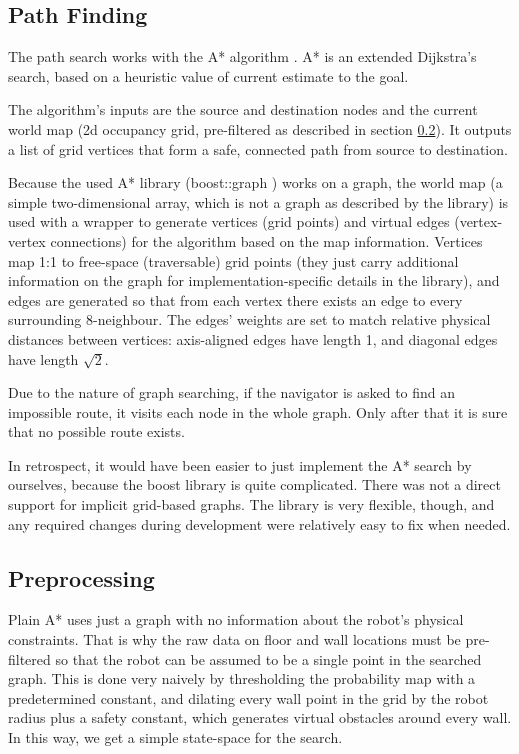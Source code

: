 \documentclass[a4paper,10pt]{article}
\begin{document}
\subsection{Path Finding}

The path search works with the A* algorithm \cite{hart1968formal}. A* is an extended Dijkstra’s search, based on a heuristic value of current estimate to the goal.

The algorithm's inputs are the source and destination nodes and the current world map (2d occupancy grid, pre-filtered as described in section \ref{navi_prepros}). It outputs a list of grid vertices that form a safe, connected path from source to destination.

Because the used A* library (boost::graph \cite{navi_boost})  works on a graph, the world map (a simple two-dimensional array, which is not a graph as described by the library) is used with a wrapper to generate vertices (grid points) and virtual edges (vertex-vertex connections) for the algorithm based on the map information. Vertices map 1:1 to free-space (traversable) grid points (they just carry additional information on the graph for implementation-specific details in the library), and edges are generated so that from each vertex there exists an edge to every surrounding 8-neighbour. The edges' weights are set to match relative physical distances between vertices: axis-aligned edges have length 1, and diagonal edges have length $\sqrt{2}$.

Due to the nature of graph searching, if the navigator is asked to find an impossible route, it visits each node in the whole graph. Only after that it is sure that no possible route exists.

In retrospect, it would have been easier to just implement the A* search by ourselves, because the boost library is quite complicated. There was not a direct support for implicit grid-based graphs. The library is very flexible, though, and any required changes during development were relatively easy to fix when needed.

\subsection{Preprocessing}
\label{navi_prepros}

Plain A* uses just a graph with no information about the robot's physical constraints. That is why the raw data on floor and wall locations must be pre-filtered so that the robot can be assumed to be a single point in the searched graph. This is done very naively by thresholding the probability map with a predetermined constant, and dilating every wall point in the grid by the robot radius plus a safety constant, which generates virtual obstacles around every wall. In this way, we get a simple state-space for the search.
\end{document}
